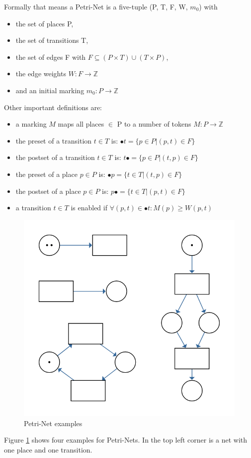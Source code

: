 Formally that means a Petri-Net is a five-tuple (P, T, F, W, $m_0$) with
\begin{itemize}
  \setlength\itemsep{-0.3em}
  \item the set of places P,
  \item the set of transitions T,
  \item the set of edges F with $F \subseteq (P \times T) \cup (T \times P)$,
  \item the edge weights $W: F \rightarrow \mathbb{Z} $
  \item and an initial marking $m_0: P \rightarrow \mathbb{Z} $
\end{itemize}
Other important definitions are:
\begin{itemize}
  \setlength\itemsep{-0.3em}
  \item a marking $M$ maps all places $\in$ P to a number of tokens $M: P \rightarrow \mathbb{Z}$
  \item the preset of a transition $t \in T$ is: $\bullet t = \{p \in P | (p,t) \in F\}$
  \item the postset of a transition $t \in T$ is: $t\bullet = \{p \in P | (t,p) \in F\}$
  \item the preset of a place $p \in P$ is: $\bullet p = \{t \in T | (t,p) \in F\}$
  \item the postset of a place $p \in P$ is: $p\bullet = \{t \in T | (p,t) \in F\}$
  \item a transition $t \in T$ is enabled if $\forall (p,t) \in \bullet t: M(p) \geq W(p,t)$
\end{itemize}
\begin{figure}
  \centering
  \includegraphics[width=.5\textwidth]{../diagrams/netExamples.png}
  \caption{Petri-Net examples}
  \label{net_examples}
\end{figure}
Figure \ref{net_examples} shows four examples for Petri-Nets.
In the top left corner is a net with one place and one transition.
